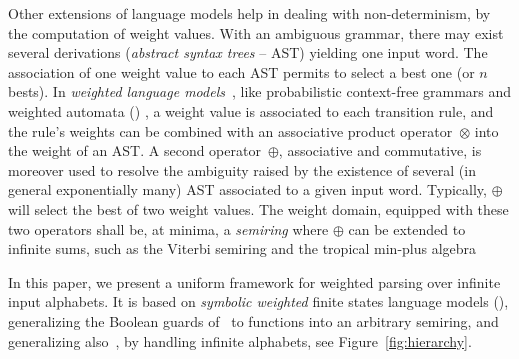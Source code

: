 Other extensions of language models  %
help in dealing with non-determinism, by the computation of weight values.
With an ambiguous grammar, there may exist several derivations
(\emph{abstract syntax trees} -- AST) %
yielding one input word. %
The association of one weight value %
to each AST permits to select a best one (or $n$ bests). %
In \emph{weighted language models}~\cite{Goodman99SemiringParsing,Nederhof03weightedParsing,MorbitzVogler19weighted-parsing},
like \eg probabilistic context-free grammars %
and weighted automata (\WA) \cite{Droste09handbook},
a weight value is associated to each transition rule, %
and the rule's weights can be combined with an
associative product operator~$\otimes$ into the weight of an AST.
A second operator~$\oplus$, associative and commutative,
is moreover used to resolve the ambiguity raised by the existence
of several (in general exponentially many) AST
associated to a given input word.
Typically, $\oplus$ will select the best of two weight values.
The weight domain, equipped with these two operators shall be, at minima,
a \emph{semiring} %
where $\oplus$ can be extended to infinite sums,
such as the Viterbi semiring and the tropical min-plus algebra%


In this paper, we present a uniform framework for weighted parsing over infinite input alphabets.
It is based on \emph{symbolic weighted} finite states language models (\swM),
generalizing the Boolean guards of~\SA %
to functions into an arbitrary semiring,
and generalizing also~\WA, by handling infinite alphabets, see Figure~\ref{fig:hierarchy}.

